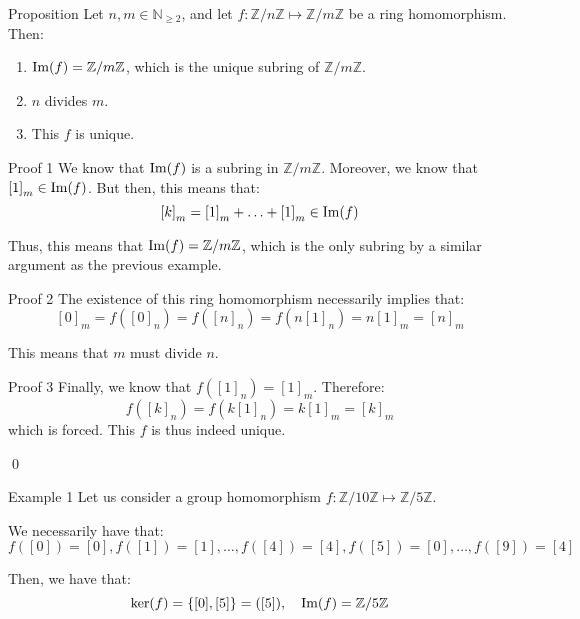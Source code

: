 \documentclass[a4paper]{article}
\begin{document}
\begin{parag}{Proposition}
    Let $n, m \in \mathbb{N}_{\geq 2}$, and let $f: \mathbb{Z}/n\mathbb{Z} \mapsto \mathbb{Z}/m\mathbb{Z}$ be a ring homomorphism. Then:
    \begin{enumerate}
        \item $\im\left(f\right) = \mathbb{Z}/m\mathbb{Z}$, which is the unique subring of $\mathbb{Z}/m\mathbb{Z}$.
        \item $n$ divides $m$.
        \item This $f$ is unique.
    \end{enumerate}

    \begin{subparag}{Proof 1}
        We know that $\im\left(f\right)$ is a subring in $\mathbb{Z}/m\mathbb{Z}$. Moreover, we know that $\left[1\right]_m \in \im\left(f\right)$. But then, this means that: 
        \[\left[k\right]_m = \left[1\right]_m + \ldots + \left[1\right]_m \in \im\left(f\right)\]
        
        Thus, this means that $\im\left(f\right) = \mathbb{Z}/m\mathbb{Z}$, which is the only subring by a similar argument as the previous example.
    \end{subparag}
    
    \begin{subparag}{Proof 2}
        The existence of this ring homomorphism necessarily implies that: 
        \[\left[0\right]_m = f\left(\left[0\right]_n\right) = f\left(\left[n\right]_n\right) = f\left(n \left[1\right]_n\right) = n\left[1\right]_m = \left[n\right]_m \]
        
        This means that $m$ must divide $n$.
    \end{subparag}

    \begin{subparag}{Proof 3}
        Finally, we know that $f\left(\left[1\right]_n\right) = \left[1\right]_m$. Therefore:
        \[f\left(\left[k\right]_n\right) = f\left(k\left[1\right]_n\right) = k\left[1\right]_m = \left[k\right]_m\]
        which is forced. This $f$ is thus indeed unique.

        \qed
    \end{subparag}
\end{parag}

\begin{parag}{Example 1}
    Let us consider a group homomorphism $f: \mathbb{Z}/10\mathbb{Z} \mapsto \mathbb{Z}/5\mathbb{Z}$.

    We necessarily have that: 
    \[f\left(\left[0\right]\right) = \left[0\right], f\left(\left[1\right]\right) = \left[1\right], \ldots, f\left(\left[4\right]\right) = \left[4\right], f\left(\left[5\right]\right) = \left[0\right], \ldots, f\left(\left[9\right]\right) = \left[4\right]\]
    
    Then, we have that: 
    \[\ker\left(f\right) = \left\{\left[0\right], \left[5\right]\right\} = \left(\left[5\right]\right), \mathspace \im\left(f\right) = \mathbb{Z}/5\mathbb{Z}\]
\end{parag}
\end{document}
